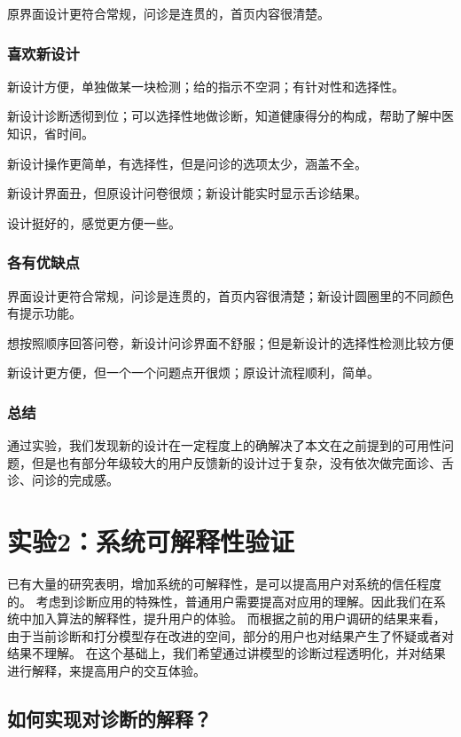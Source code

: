 原界面设计更符合常规，问诊是连贯的，首页内容很清楚。


\subsubsection{喜欢新设计}

新设计方便，单独做某一块检测；给的指示不空洞；有针对性和选择性。

新设计诊断透彻到位；可以选择性地做诊断，知道健康得分的构成，帮助了解中医知识，省时间。

新设计操作更简单，有选择性，但是问诊的选项太少，涵盖不全。

新设计界面丑，但原设计问卷很烦；新设计能实时显示舌诊结果。

设计挺好的，感觉更方便一些。


\subsubsection{各有优缺点}

界面设计更符合常规，问诊是连贯的，首页内容很清楚；新设计圆圈里的不同颜色有提示功能。

想按照顺序回答问卷，新设计问诊界面不舒服；但是新设计的选择性检测比较方便

新设计更方便，但一个一个问题点开很烦；原设计流程顺利，简单。

\subsubsection{总结}
通过实验，我们发现新的设计在一定程度上的确解决了本文在之前提到的可用性问题，但是也有部分年级较大的用户反馈新的设计过于复杂，没有依次做完面诊、舌诊、问诊的完成感。

\section{实验2：系统可解释性验证}

已有大量的研究表明，增加系统的可解释性，是可以提高用户对系统的信任程度的。
考虑到诊断应用的特殊性，普通用户需要提高对应用的理解。因此我们在系统中加入算法的解释性，提升用户的体验。
而根据之前的用户调研的结果来看，由于当前诊断和打分模型存在改进的空间，部分的用户也对结果产生了怀疑或者对结果不理解。
在这个基础上，我们希望通过讲模型的诊断过程透明化，并对结果进行解释，来提高用户的交互体验。

\subsection{如何实现对诊断的解释？}

